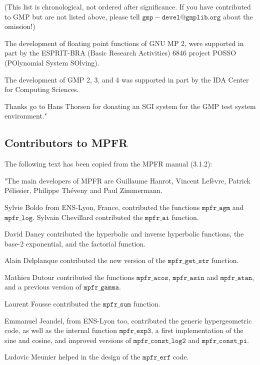 \vpara
(This list is chronological, not ordered after significance.  If you have
contributed to GMP but are not listed above, please tell
$\mathtt{gmp-devel@gmplib.org}$ about the omission!)

\vpara
The development of floating point functions of GNU MP 2, were supported in part
by the ESPRIT-BRA (Basic Research Activities) 6846 project POSSO (POlynomial
System SOlving).

\vpara
The development of GMP 2, 3, and 4 was supported in part by the IDA Center for
Computing Sciences.

\vpara
Thanks go to Hans Thorsen for donating an SGI system for the GMP test system
environment."





\subsection{Contributors to MPFR}
\label{Contributors to MPFR}
The following text has been copied from the MPFR manual (3.1.2):

\vpara
"The main developers of MPFR are Guillaume Hanrot, Vincent Lef\`evre,
Patrick P\'elissier, Philippe Th\'eveny and Paul Zimmermann.

\vpara
Sylvie Boldo from ENS-Lyon, France,
contributed the functions $\mathtt{mpfr\_agm}$ and $\mathtt{mpfr\_log}$.
Sylvain Chevillard contributed the $\mathtt{mpfr\_ai}$ function.

\vpara
David Daney contributed the hyperbolic and inverse hyperbolic functions,
the base-2 exponential, and the factorial function.

\vpara
Alain Delplanque contributed the new version of the $\mathtt{mpfr\_get\_str}$
function.

\vpara
Mathieu Dutour contributed the functions $\mathtt{mpfr\_acos}$, $\mathtt{mpfr\_asin}$
and $\mathtt{mpfr\_atan}$, and a previous version of $\mathtt{mpfr\_gamma}$.

\vpara
Laurent Fousse contributed the $\mathtt{mpfr\_sum}$ function.

\vpara
Emmanuel Jeandel, from ENS-Lyon too,
contributed the generic hypergeometric code,
as well as the internal function $\mathtt{mpfr\_exp3}$,
a first implementation of the sine and cosine,
and improved versions of
$\mathtt{mpfr\_const\_log2}$ and $\mathtt{mpfr\_const\_pi}$.

\vpara
Ludovic Meunier helped in the design of the $\mathtt{mpfr\_erf}$ code.

